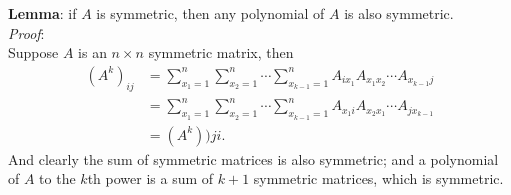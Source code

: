 \documentclass[11pt]{article}
\begin{document}
\section{}
\textbf{Lemma}: if $A$ is symmetric, then any polynomial of $A$ is also symmetric.\\[0.4cm]
\textit{Proof}: \\[0.3cm]
Suppose $A$ is an $n\times n$ symmetric matrix, then
\begin{equation}\begin{split}
(A^k)_{ij} &=\sum_{x_1=1}^n \sum_{x_2=1}^n\cdots\sum_{x_{k-1}=1}^nA_{ix_1}A_{x_1x_2}\cdots A_{x_{k-1}j}\\
&=\sum_{x_1=1}^n \sum_{x_2=1}^n\cdots\sum_{x_{k-1}=1}^nA_{x_1i}A_{x_2x_1}\cdots A_{jx_{k-1}}\\
&=(A^k)){ji}.
\end{split}\nonumber\end{equation} 
And clearly the sum of symmetric matrices is also symmetric; and a polynomial of $A$ to the $k$th power is a sum of $k+1$ symmetric matrices, which is symmetric.\\[0,4cm]
\end{document}

